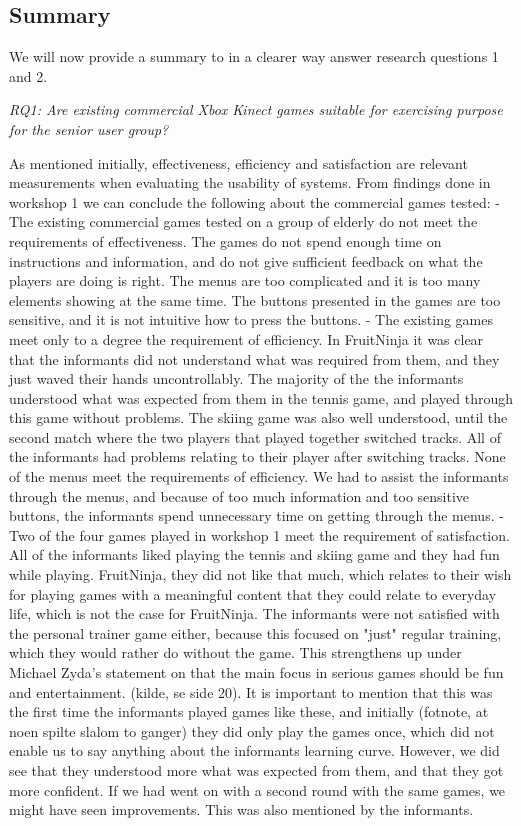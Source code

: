 \subsection{Summary}
We will now provide a summary to in a clearer way answer research questions 1 and 2. 

\emph{RQ1: Are existing commercial Xbox Kinect games suitable for exercising purpose for the senior user group?}

As mentioned initially, effectiveness, efficiency  and satisfaction are relevant measurements when evaluating the usability of systems. From findings done in workshop 1 we can conclude the following about the commercial games tested: 
- The existing commercial games tested on a group of elderly do not meet the requirements of effectiveness. The games do not spend enough time on instructions and information, and do not give sufficient feedback on what the players are doing is right. The menus are too complicated and it is too many elements showing at the same time. The buttons presented in the games are too sensitive, and it is not intuitive how to press the buttons. 
- The existing games meet only to a degree the requirement of efficiency. In FruitNinja it was clear that the informants did not understand what was required from them, and they just waved their hands uncontrollably. The majority of the the informants understood what was expected from them in the tennis game, and played through this game without problems. The skiing game was also well understood, until the second match where the two players that played together switched tracks. All of the informants had problems relating to their player after switching tracks. None of the menus meet the requirements of efficiency. We had to assist the informants through the menus, and because of too much information and too sensitive buttons, the informants spend unnecessary time on getting through the menus.
-  Two of the four games played in workshop 1 meet the requirement of satisfaction. All of the informants liked playing the tennis and skiing game and they had fun while playing. FruitNinja, they did not like that much, which relates to their wish for playing games with a meaningful content that they could relate to everyday life, which is not the case for FruitNinja. The informants were not satisfied with the personal trainer game either, because this focused on "just" regular training, which they would rather do without the game. This strengthens up under Michael Zyda's statement on that the main focus in serious games should be fun and entertainment. (kilde, se side 20). 
It is important to mention that this was the first time the informants played games like these, and initially (fotnote, at noen spilte slalom to ganger) they did only play the games once, which did not enable us to say anything about the informants learning curve. However, we did see that they understood more what was expected from them, and that they got more confident. If we had went on with a second round with the same games, we might have seen improvements. This was also mentioned by the informants. 

